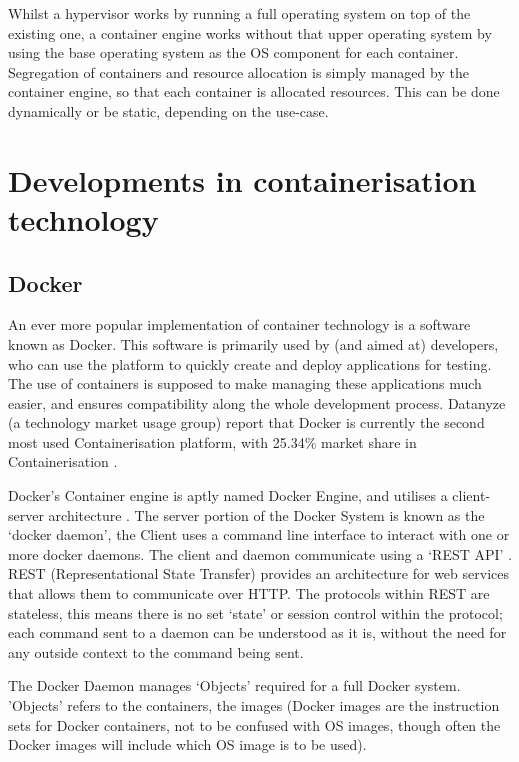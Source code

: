 Whilst a hypervisor works by running a full operating system on top of the existing one, a container engine works without that upper operating system by using the base operating system as the OS component for each container. Segregation of containers and resource allocation is simply managed by the container engine, so that each container is allocated resources. This can be done dynamically or be static, depending on the use-case.




\section{Developments in containerisation technology}

\subsection{Docker}
An ever more popular implementation of container technology is a software known as Docker. This software is primarily used by (and aimed at) developers, who can use the platform to quickly create and deploy applications for testing. The use of containers is supposed to make managing these applications much easier, and ensures compatibility along the whole development process.
Datanyze (a technology market usage group) report that Docker is currently the second most used Containerisation platform, with 25.34\% market share in Containerisation \citep{datanyze}. 

Docker's Container engine is aptly named Docker Engine, and utilises a client-server architecture \citep[Section: Docker architecture]{DockerOverview}. The server portion of the Docker System is known as the `docker daemon', the Client uses a command line interface to interact with one or more docker daemons. The client and daemon communicate using a `REST API' \citep[Section: The Docker daemon]{DockerOverview}. REST (Representational State Transfer) provides an architecture for web services \citep{W3Architecture2004} that allows them to communicate over HTTP. The protocols within REST are stateless, this means there is no set `state' or session control within the protocol; each command sent to a daemon can be understood as it is, without the need for any outside context to the command being sent.

The Docker Daemon manages `Objects' \citep[Section: Docker objects]{DockerOverview} required for a full Docker system. 'Objects' refers to the containers, the images (Docker images are the instruction sets for Docker containers, not to be confused with OS images, though often the Docker images will include which OS image is to be used).

